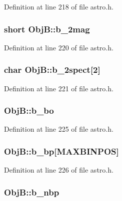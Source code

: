 Definition at line 218 of file astro.\-h.

\hypertarget{struct_obj_b_a16a3be87a937ea9c4387056771aa0add}{
\subsubsection[{b\-\_\-2mag}]{\setlength{\rightskip}{0pt plus 5cm}short Obj\-B\-::b\-\_\-2mag}}\label{struct_obj_b_a16a3be87a937ea9c4387056771aa0add}


Definition at line 220 of file astro.\-h.

\hypertarget{struct_obj_b_a4e3335adf18f2b6140f6f92e3e78a350}{
\subsubsection[{b\-\_\-2spect}]{\setlength{\rightskip}{0pt plus 5cm}char Obj\-B\-::b\-\_\-2spect\mbox{[}2\mbox{]}}}\label{struct_obj_b_a4e3335adf18f2b6140f6f92e3e78a350}


Definition at line 221 of file astro.\-h.

\hypertarget{struct_obj_b_a5bc226e04f07466871691875560c91a9}{
\subsubsection[{b\-\_\-bo}]{ Obj\-B\-::b\-\_\-bo}}\label{struct_obj_b_a5bc226e04f07466871691875560c91a9}


Definition at line 225 of file astro.\-h.

\hypertarget{struct_obj_b_a7511eaac1e5e7c4f30ebb1cc5ba546a2}{
\subsubsection[{b\-\_\-bp}]{ Obj\-B\-::b\-\_\-bp\mbox{[}{\bf M\-A\-X\-B\-I\-N\-P\-O\-S}\mbox{]}}}\label{struct_obj_b_a7511eaac1e5e7c4f30ebb1cc5ba546a2}


Definition at line 226 of file astro.\-h.

\hypertarget{struct_obj_b_a3314e81ed5e1a63b2bc9c91aa05161fe}{
\subsubsection[{b\-\_\-nbp}]{ Obj\-B\-::b\-\_\-nbp}}\label{struct_obj_b_a3314e81ed5e1a63b2bc9c91aa05161fe}


